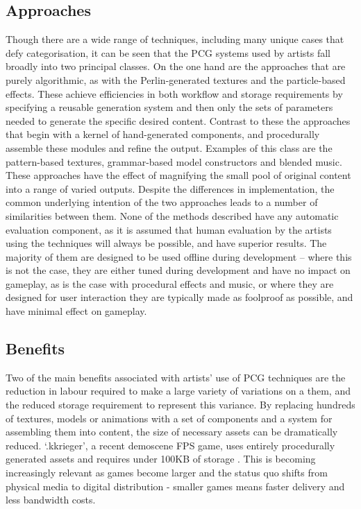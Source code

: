 \documentclass{acm_proc_article-sp}
\begin{document}
\subsection{Approaches}
Though there are a wide range of techniques, including many unique cases that defy categorisation, it can be seen that the PCG systems used by artists fall broadly into two principal classes. On the one hand are the approaches that are purely algorithmic, as with the Perlin-generated textures and the particle-based effects. These achieve efficiencies in both workflow and storage requirements by specifying a reusable generation system and then only the sets of parameters needed to generate the specific desired content. Contrast to these the approaches that begin with a kernel of hand-generated components, and procedurally assemble these modules and refine the output. Examples of this class are the pattern-based textures, grammar-based model constructors and blended music. These approaches have the effect of magnifying the small pool of original content into a range of varied outputs.
Despite the differences in implementation, the common underlying intention of the two approaches leads to a number of similarities between them. None of the methods described have any automatic evaluation component, as it is assumed that human evaluation by the artists using the techniques will always be possible, and have superior results. The majority of them are designed to be used offline during development -- where this is not the case, they are either tuned during development and have no impact on gameplay, as is the case with procedural effects and music, or where they are designed for user interaction they are typically made as foolproof as possible, and have minimal effect on gameplay.

\subsection{Benefits}
Two of the main benefits associated with artists' use of PCG techniques are the reduction in labour required to make a large variety of variations on a them, and the reduced storage requirement to represent this variance. By replacing hundreds of textures, models or animations with a set of components and a system for assembling them into content, the size of necessary assets can be dramatically reduced. `.kkrieger', a recent demoscene FPS game, uses entirely procedurally generated assets and requires under 100KB of storage \cite{kkrieger}. This is becoming increasingly relevant as games become larger and the status quo shifts from physical media to digital distribution - smaller games means faster delivery and less bandwidth costs. %
\end{document}

